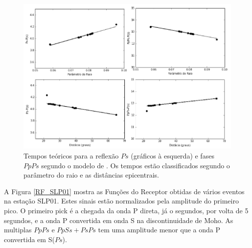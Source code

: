 \begin{figure}[!ht]
\centering
\includegraphics[scale=0.7]{tempo_teorico_modelo_tauptime.png}
\caption{Tempos teóricos para a reflexão $Ps$ (gráficos à esquerda) e fases $PpPs$ segundo o modelo de \cite{kennet_iaspei_1991}. Os tempos estão classificados segundo o parâmetro do raio e as distâncias epicentrais.}
\label{tauptime}
\end{figure}


A Figura \ref{RF_SLP01} mostra as Funções do Receptor obtidas de vários eventos na estação SLP01. Estes sinais estão normalizados pela amplitude do primeiro pico. O primeiro pick é a chegada da onda P direta, já o segundos, por volta de 5 segundos, e a onda P convertida em onda S na discontinuidade de Moho. As multiplas $PpPs$ e $PpSs+PsPs$ tem uma amplitude menor que a onda P convertida em S($Ps$). 

